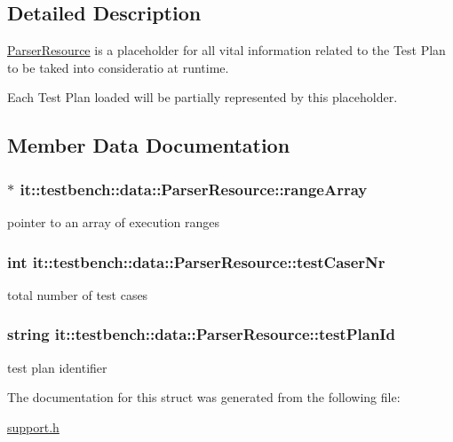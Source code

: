 \subsection{Detailed Description}
\hyperlink{structit_1_1testbench_1_1data_1_1ParserResource}{Parser\-Resource} is a placeholder for all vital information related to the Test Plan to be taked into consideratio at runtime.

Each Test Plan loaded will be partially represented by this placeholder. 

\subsection{Member Data Documentation}
\hypertarget{structit_1_1testbench_1_1data_1_1ParserResource_a59703b51392239c337cab02042249b49}{
\subsubsection[{range\-Array}]{$\ast$ it\-::testbench\-::data\-::\-Parser\-Resource\-::range\-Array}}\label{d5/ddd/structit_1_1testbench_1_1data_1_1ParserResource_a59703b51392239c337cab02042249b49}
pointer to an array of execution ranges \hypertarget{structit_1_1testbench_1_1data_1_1ParserResource_ac0c1eb32c479fb54a5eb724ae2c5f7c5}{
\subsubsection[{test\-Caser\-Nr}]{\setlength{\rightskip}{0pt plus 5cm}int it\-::testbench\-::data\-::\-Parser\-Resource\-::test\-Caser\-Nr}}\label{d5/ddd/structit_1_1testbench_1_1data_1_1ParserResource_ac0c1eb32c479fb54a5eb724ae2c5f7c5}
total number of test cases \hypertarget{structit_1_1testbench_1_1data_1_1ParserResource_a3212973ffcb3bdd68d2878768b7a07d1}{
\subsubsection[{test\-Plan\-Id}]{\setlength{\rightskip}{0pt plus 5cm}string it\-::testbench\-::data\-::\-Parser\-Resource\-::test\-Plan\-Id}}\label{d5/ddd/structit_1_1testbench_1_1data_1_1ParserResource_a3212973ffcb3bdd68d2878768b7a07d1}
test plan identifier 

The documentation for this struct was generated from the following file\-:\begin{DoxyCompactItemize}
\item 
\hyperlink{support_8h}{support.\-h}\end{DoxyCompactItemize}

